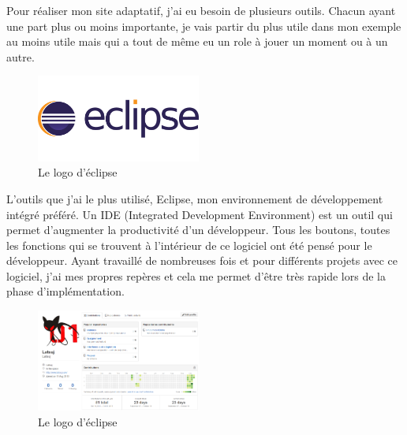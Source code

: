 \documentclass{article}
\begin{document}
Pour r\'ealiser mon site adaptatif, j'ai eu besoin de plusieurs outils. Chacun ayant une part plus ou moins importante, je vais partir du plus utile dans mon exemple au moins utile mais qui a tout de m\^eme eu un role \`a jouer un moment ou \`a un autre.\\
\begin{figure}
  \vspace{-20pt}
  \begin{center}
    \includegraphics[width=0.48\textwidth]{p22}
  \end{center}
  \vspace{-20pt}
  \caption{Le logo d'\'eclipse}
  \vspace{-10pt}
\end{figure}

L'outils que j'ai le plus utilis\'e, Eclipse, mon environnement de d\'eveloppement int\'egr\'e pr\'ef\'er\'e. Un IDE (Integrated Development Environment) est un outil qui permet d'augmenter la productivit\'e d'un d\'eveloppeur. Tous les boutons, toutes les fonctions qui se trouvent \`a l'int\'erieur de ce logiciel ont \'et\'e pens\'e pour le d\'eveloppeur. Ayant travaill\'e de nombreuses fois et pour diff\'erents projets avec ce logiciel, j'ai mes propres rep\`eres et cela me permet d'\^etre tr\`es rapide lors de la phase d'impl\'ementation.\\
\begin{figure}
  \vspace{-20pt}
  \begin{center}
    \includegraphics[width=0.48\textwidth]{p23}
  \end{center}
  \vspace{-20pt}
  \caption{Le logo d'\'eclipse}
  \vspace{-10pt}
\end{figure}
\end{document}
